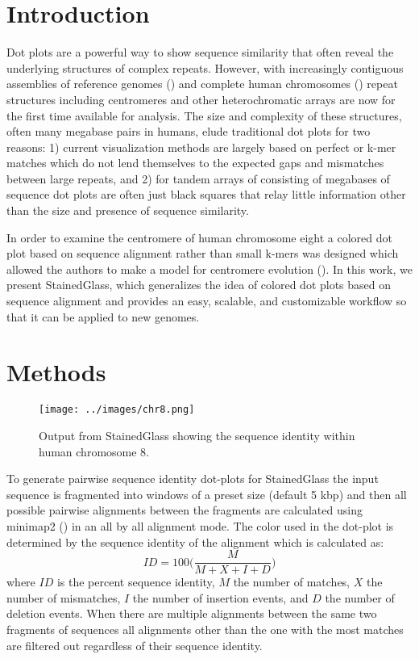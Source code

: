 \documentclass{bioinfo}
\begin{document}
\section{Introduction}
Dot plots are a powerful way to show sequence similarity that often reveal the
underlying structures of complex repeats. However, with increasingly contiguous
assemblies of reference genomes (\citealp{Rhie2021-zg}) and complete human
chromosomes (\citealp{Miga2020-pj,Logsdon2021-zr,Nurk2021-wb}) repeat structures
including centromeres and other heterochromatic arrays are now for the first
time available for analysis. The size and complexity of these structures, often
many megabase pairs in humans, elude traditional dot plots for two reasons: 1)
current visualization methods are largely based on perfect or k-mer matches
which do not lend themselves to the expected gaps and mismatches between large
repeats, and 2) for tandem arrays of consisting of megabases of sequence dot
plots are often just black squares that relay little information other than the
size and presence of sequence similarity. 

In order to examine the centromere of human chromosome eight a colored dot plot
based on sequence alignment rather than small k-mers was designed which allowed
the authors to make a model for centromere evolution (\citealp{Logsdon2021-zr}).
In this work, we present StainedGlass, which generalizes the idea of colored dot
plots based on sequence alignment and provides an easy, scalable, and
customizable workflow so that it can be applied to new genomes. 

\section{Methods} 
\begin{figure}[!tpb]%
\centerline{
	\texttt{[image: ../images/chr8.png]}
}
\caption{Output from StainedGlass showing the sequence identity within human
chromosome 8.}
\label{fig:01} 
\end{figure}


To generate pairwise sequence identity dot-plots for StainedGlass the input
sequence is fragmented into windows of a preset size (default 5 kbp) and then
all possible pairwise alignments between the fragments are calculated using
minimap2 (\citealp{Li2018-is}) in an all by all alignment mode. The color used in the
dot-plot is determined by the sequence identity of the alignment which is
calculated as: $$ ID = 100 \biggl( \frac{M}{M+X+I+D} \biggr) $$ where $ID$ is
the percent sequence identity, $M$ the number of matches, $X$ the number of
mismatches, $I$ the number of insertion events, and $D$ the number of deletion
events. When there are multiple alignments between the same two fragments of
sequences all alignments other than the one with the most matches are filtered
out regardless of their sequence identity.
\end{document}
